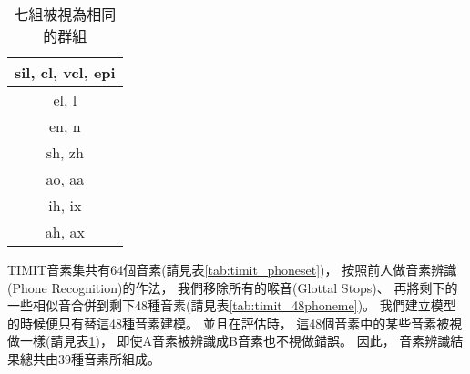   \begin{table}
    \begin{center}
    \scalebox{0.7}
    {
      \begin{tabular}{|c|}
	\hline sil, cl, vcl, epi \\
	\hline el, l \\
	\hline en, n \\
	\hline sh, zh \\
	\hline ao, aa \\
	\hline ih, ix \\
	\hline ah, ax \\
	\hline
      \end{tabular}
    }
    \caption{七組被視為相同的群組}
    \label{tab:timit_confusion}
    \end{center}
  \end{table}
  TIMIT音素集共有64個音素(請見表\ref{tab:timit_phoneset})，
  按照前人做音素辨識(Phone Recognition)的作法\cite{KaifuLee}，
  我們移除所有的喉音(Glottal Stops)、
  再將剩下的一些相似音合併到剩下48種音素(請見表\ref{tab:timit_48phoneme})。
  我們建立模型的時候便只有替這48種音素建模。
  並且在評估時，
  這48個音素中的某些音素被視做一樣(請見表\ref{tab:timit_confusion})，
  即使A音素被辨識成B音素也不視做錯誤。
  因此，
  音素辨識結果總共由39種音素所組成。
